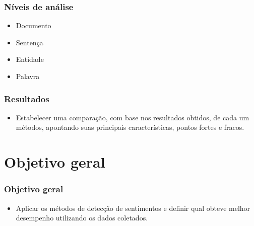 \documentclass{beamer}
\begin{document}
\begin{frame}%
\frametitle{\textbf{Níveis de análise}\transdissolve}%
\begin{itemize}%
\item<1->Documento
\item<2->Sentença
\item<3->Entidade
\item<4->Palavra
\end{itemize}
\end{frame}

\begin{frame}%
\frametitle{\textbf{Resultados}\transdissolve}%
\begin{itemize}
    \item Estabelecer uma comparação, com base nos resultados obtidos, de cada um métodos, apontando suas principais características, pontos fortes e fracos.
\end{itemize}
\end{frame}

\section{Objetivo geral}
\begin{frame}%
\frametitle{\textbf{Objetivo geral}\transdissolve}%
\begin{itemize}%
\item<1->Aplicar os métodos de detecção de sentimentos e definir qual obteve melhor desempenho utilizando os dados coletados.
\end{itemize}
\end{frame}
\end{document}
